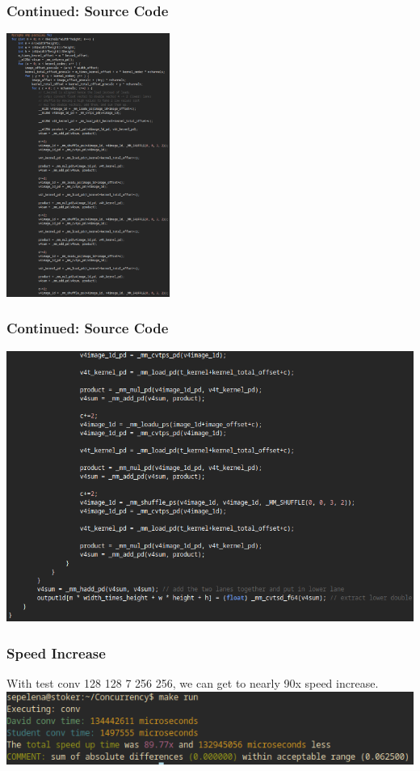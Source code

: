 \documentclass{beamer}
\begin{document}
\begin{frame}[fragile]
\frametitle{Continued: Source Code}
\includegraphics[width=0.4\textwidth]{images/student-conv-part2}
\end{frame}

\begin{frame}[fragile]
\frametitle{Continued: Source Code}
\includegraphics[width=1\textwidth]{images/student-conv-part3}
\end{frame}

\begin{frame}[fragile]
\frametitle{Speed Increase}
With test conv 128 128 7 256 256, we can get to nearly 90x speed increase. \\
\includegraphics[width=1\textwidth]{images/stoker-89x}
\end{frame}
\end{document}

